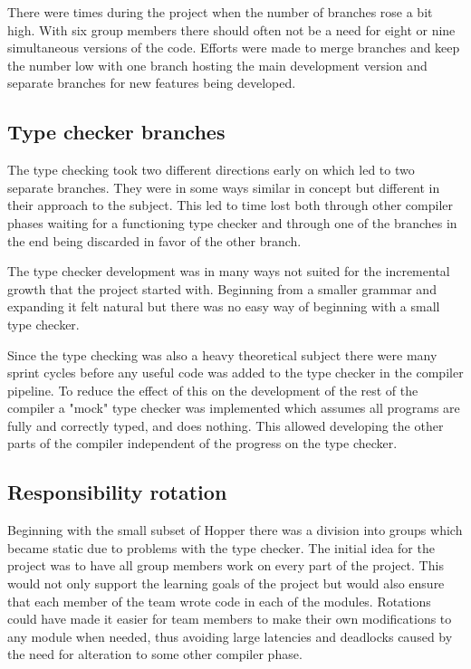 There were times during the project when the number of branches rose a bit high. With six group members there should often not be a need for eight or nine simultaneous versions of the code. Efforts were made to merge branches and keep the number low with one branch hosting the main development version and separate branches for new features being developed.

\subsection{Type checker branches}

The type checking took two different directions early on which led to two separate branches. They were in some ways similar in concept but different in their approach to the subject. This led to time lost both through other compiler phases waiting for a functioning type checker and through one of the branches in the end being discarded in favor of the other branch. 

The type checker development was in many ways not suited for the incremental growth that the project started with. Beginning from a smaller grammar and expanding it felt natural but there was no easy way of beginning with a small type checker. 

Since the type checking was also a heavy theoretical subject there were many sprint cycles before any useful code was added to the type checker in the compiler pipeline. To reduce the effect of this on the development of the rest of the compiler a "mock" type checker was implemented which assumes all programs are fully and correctly typed, and does nothing. This allowed developing the other parts of the compiler independent of the progress on the type checker.


\subsection{Responsibility rotation}

Beginning with the small subset of Hopper there was a division into groups which became static due to problems with the type checker.
The initial idea for the project was to have all group members work on every part of the project. This would not only support the learning goals of the project but would also ensure that each member of the team wrote code in each of the modules. Rotations could have made it easier for team members to make their own modifications to any module when needed, thus avoiding large latencies and deadlocks caused by the need for alteration to some other compiler phase. 

